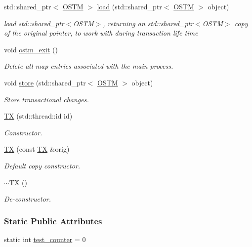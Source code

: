 \begin{DoxyCompactItemize}
std\+::shared\+\_\+ptr$<$ \hyperlink{class_o_s_t_m}{O\+S\+TM} $>$ \hyperlink{class_t_x_a1d78262b8831ddd042ed491f2e600e24_a1d78262b8831ddd042ed491f2e600e24}{load} (std\+::shared\+\_\+ptr$<$ \hyperlink{class_o_s_t_m}{O\+S\+TM} $>$ object)
\begin{DoxyCompactList}\small\item\em load std\+::shared\+\_\+ptr$<$\+O\+S\+T\+M$>$, returning an std\+::shared\+\_\+ptr$<$\+O\+S\+T\+M$>$ copy of the original pointer, to work with during transaction life time \end{DoxyCompactList}\item 
void \hyperlink{class_t_x_aa9739c5c2077454c779098db7baefc2b_aa9739c5c2077454c779098db7baefc2b}{ostm\+\_\+exit} ()
\begin{DoxyCompactList}\small\item\em Delete all map entries associated with the main process. \end{DoxyCompactList}\item 
void \hyperlink{class_t_x_a7dbcb369aa4a3370b6c6829d278ece5d_a7dbcb369aa4a3370b6c6829d278ece5d}{store} (std\+::shared\+\_\+ptr$<$ \hyperlink{class_o_s_t_m}{O\+S\+TM} $>$ object)
\begin{DoxyCompactList}\small\item\em Store transactional changes. \end{DoxyCompactList}\item 
\hyperlink{class_t_x_a8a4b83eab0171ae834bfa92bbced1094_a8a4b83eab0171ae834bfa92bbced1094}{TX} (std\+::thread\+::id id)
\begin{DoxyCompactList}\small\item\em Constructor. \end{DoxyCompactList}\item 
\hyperlink{class_t_x_ab96b3dd2bfd621b47307f0af3ec4f35c_ab96b3dd2bfd621b47307f0af3ec4f35c}{TX} (const \hyperlink{class_t_x}{TX} \&orig)
\begin{DoxyCompactList}\small\item\em Default copy constructor. \end{DoxyCompactList}\item 
\hyperlink{class_t_x_abecf854cc3228ab6dd51175b3cd1c70a_abecf854cc3228ab6dd51175b3cd1c70a}{$\sim$\+TX} ()
\begin{DoxyCompactList}\small\item\em De-\/constructor. \end{DoxyCompactList}\end{DoxyCompactItemize}
\subsubsection*{Static Public Attributes}
\begin{DoxyCompactItemize}
\item 
static int \hyperlink{class_t_x_a25838234aab99ae891a90eb8623a8b3c_a25838234aab99ae891a90eb8623a8b3c}{test\+\_\+counter} = 0
\end{DoxyCompactItemize}
